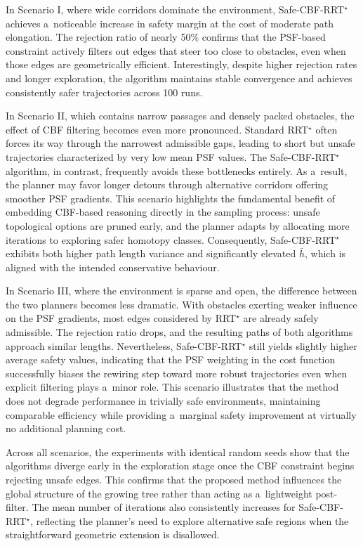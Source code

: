 \documentclass[letterpaper, 10 pt, conference]{ieeeconf}
\begin{document}
In Scenario I, where wide corridors dominate the environment,
Safe-CBF-RRT$^\star$ achieves a~noticeable increase in safety margin at
the cost of moderate path elongation. The rejection ratio of nearly 50\%
confirms that the PSF-based constraint actively filters out edges that
steer too close to obstacles, even when those edges are geometrically
efficient. Interestingly, despite higher rejection rates and longer exploration,
the algorithm maintains stable convergence and achieves consistently safer
trajectories across 100 runs.

In Scenario II, which contains narrow passages and densely packed obstacles,
the effect of CBF filtering becomes even more pronounced. Standard RRT$^\star$
often forces its way through the narrowest admissible gaps, leading to short but
unsafe trajectories characterized by very low mean PSF values. The
Safe-CBF-RRT$^\star$ algorithm, in contrast, frequently avoids these bottlenecks
entirely. As a~result, the planner may favor longer detours through alternative
corridors offering smoother PSF gradients. This scenario highlights the
fundamental benefit of embedding CBF-based reasoning directly in the sampling
process: unsafe topological options are pruned early, and the planner adapts by
allocating more iterations to exploring safer homotopy classes. Consequently,
Safe-CBF-RRT$^\star$ exhibits both higher path length variance and significantly elevated 
$\bar{h}$, which is aligned with the intended conservative behaviour.

In Scenario III, where the environment is sparse and open, the difference
between the two planners becomes less dramatic. With obstacles exerting weaker
influence on the PSF gradients, most edges considered by RRT$^\star$ are already
safely admissible. The rejection ratio drops, and the resulting paths of both
algorithms approach similar lengths. Nevertheless, Safe-CBF-RRT$^\star$ still
yields slightly higher average safety values, indicating that the PSF weighting
in the cost function successfully biases the rewiring step toward more robust
trajectories even when explicit filtering plays a~minor role. This scenario
illustrates that the method does not degrade performance in trivially safe
environments, maintaining comparable efficiency while providing a~marginal
safety improvement at virtually no additional planning cost.

Across all scenarios, the experiments with identical random seeds show that
the algorithms diverge early in the exploration stage once the CBF constraint
begins rejecting unsafe edges. This confirms that the proposed method influences
the global structure of the growing tree rather than acting as a~lightweight
post-filter. The mean number of iterations also consistently increases for
Safe-CBF-RRT$^\star$, reflecting the planner's need to explore alternative safe
regions when the straightforward geometric extension is disallowed.
\end{document}
